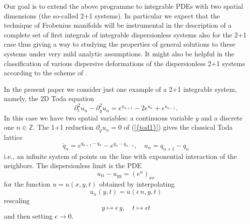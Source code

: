\documentclass[numbook, envcountsame, envcountreset]{svjour3}
\begin{document}
Our goal is to extend the above programme to integrable PDEs with two spatial dimensions (the so-called 2+1 systems). In particular we expect that the technique of Frobenius manifolds will be instrumental in the description of a complete set of first integrals of integrable dispersionless systems also for the 2+1  case thus giving a way to studying the properties of general solutions to these systems under very mild analytic assumptions. It might also be helpful in the classification of various dispersive deformations of the dispersionless 2+1 systems according to the scheme of \cite{cpam}.

In the present paper we consider just one example of a 2+1 integrable system, namely, the 2D Toda equation
\begin{equation}\label{tod1}
{\partial}_t^2 u_n -{\partial}_y^2 u_n = e^{u_{n+1}}-2 e^{u_n}+e^{u_{n-1}}.
\end{equation}
In this case we have two spatial variables: a continuous variable $y$ and a discrete one $n\in\mathbb Z$. The 1+1 reduction ${\partial}_y u_n=0$ of {(\ref{{tod1}})} gives the classical Toda lattice
$$
\ddot q_n =e^{q_{n+1}-q_n} -e^{q_n-q_{n-1}}, \quad u_n = q_{n+1}-q_n
$$
 i.e., an infinite system of points on the line with exponential interaction of the neighbors. The dispersionless limit is the PDE
\begin{equation}\label{tod2}
u_{tt} -u_{yy} = \left( e^u\right)_{xx}
\end{equation}
 for the function $u=u(x,y,t)$ obtained by interpolating
$$
u_n(y,t) = u(\epsilon\, n, y, t)
$$
rescaling
$$
y\mapsto \epsilon\, y, \quad t\mapsto \epsilon t
$$
and then setting $\epsilon\to 0$.
\end{document}
